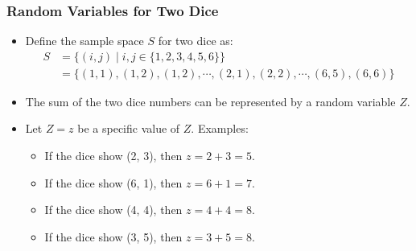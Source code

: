 \documentclass[handout]{beamer} %
\begin{document}
\begin{frame}
    \frametitle{Random Variables for Two Dice}
    \begin{itemize}
        \item Define the sample space \( S \) for two dice as: \pause
        \begin{align*}
        S &= \big\{(i, j) \mid i, j \in \big\{1, 2, 3, 4, 5, 6\big\}\big\} \\
          &= \big\{(1,1), (1,2), (1,2), \cdots, (2,1), (2,2), \cdots, (6,5), (6,6)\big\}    
        \end{align*}
        \pause \vspace{-1.5em}
        \item The sum of the two dice numbers can be represented by a random variable \( Z \). \pause
        \item Let $Z=z$ be a specific value of $Z$. Examples: \pause
        \begin{itemize}
            \item If the dice show (2, 3), then \( z = 2 + 3 = 5 \). \pause
            \item If the dice show (6, 1), then \( z = 6 + 1 = 7 \). \pause
            \item If the dice show (4, 4), then \( z = 4 + 4 = 8 \). \pause
            \item If the dice show (3, 5), then \( z = 3 + 5 = 8 \). \pause
        \end{itemize}
    \end{itemize}
\end{frame}
\end{document}
